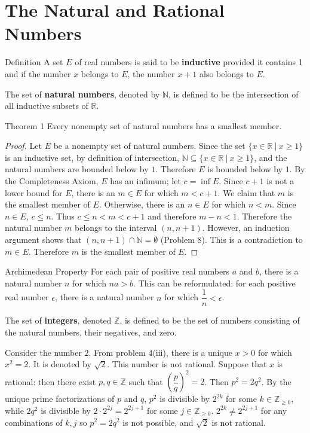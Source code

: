\documentclass[a4paper,10pt]{book}
\theoremstyle{plain} %
\newcommand{\thistheoremname}{}
\newtheorem*{genericthm*}{\thistheoremname}
\newenvironment{namedthm*}[1]
	{\renewcommand{\thistheoremname}{#1}%
	\begin{genericthm*}}
	{\end{genericthm*}}
\begin{document}
\section{The Natural and Rational Numbers}
\begin{flushleft}

\begin{namedthm*}{Definition}
	A set $E$ of real numbers is said to be \textbf{inductive} provided it contains 1 and if the number $x$ belongs to $E$, the number $x+1$ also belongs to $E$.
\end{namedthm*}

The set of \textbf{natural numbers}, denoted by $\mathbb{N}$, is defined to be the intersection of all inductive subsets of $\mathbb{R}$. 

\begin{namedthm*}{Theorem 1}
	Every nonempty set of natural numbers has a smallest member.
\end{namedthm*}
\begin{proof}
	Let $E$ be a nonempty set of natural numbers. Since the set $\{x\in \mathbb{R}\ |\ x \ge 1 \}$ is an inductive set, by definition of intersection, $\mathbb{N} \subseteq \{x\in \mathbb{R}\ |\ x \ge 1 \}$, and the natural numbers are bounded below by $1$.
	Therefore $E$ is bounded below by $1$. By the Completeness Axiom, $E$ has an infimum; let $c=\inf E$.
	Since $c+1$ is not a lower bound for $E$, there is an $m \in E$ for which $m < c+1$.
	We claim that $m$ is the smallest member of $E$. Otherwise, there is an $n\in E$ for which $n<m$. Since $n \in E$, $c\le n$. Thus $c \le n < m < c+1$ and therefore $m-n<1$.
	Therefore the natural number $m$ belongs to the interval $(n,n+1)$. However, an induction argument shows that $(n, n+1) \cap \mathbb{N} = \emptyset$ (Problem 8). 
	This is a contradiction to $m \in E$. Therefore $m$ is the smallest member of $E$.
\end{proof}

\begin{namedthm*}{Archimedean Property}
	For each pair of positive real numbers $a$ and $b$, there is a natural number $n$ for which $na>b$. This can be reformulated: for each positive real number $\epsilon$, there is a natural number $n$ for which $\dfrac{1}{n} < \epsilon$.
\end{namedthm*}

The set of \textbf{integers}, denoted $\mathbb{Z}$, is defined to be the set of numbers consisting of the natural numbers, their negatives, and zero.
\par
\medskip
Consider the number $2$. From problem 4(iii), there is a unique $x>0$ for which $x^2=2$. It is denoted by $\sqrt{2}$. This number is not rational.
Suppose that $x$ is rational: then there exist $p,q \in \mathbb{Z}$ such that $(\dfrac{p}{q})^2=2$. Then $p^2=2q^2$. 
By the unique prime factorizations of $p$ and $q$, $p^2$ is divisible by $2^{2k}$ for some $k \in \mathbb{Z}_{\ge 0}$, while $2q^2$ is divisible by $2 \cdot 2^{2j} = 2^{2j+1}$ for some $j \in \mathbb{Z}_{\ge 0}$.
$2^{2k} \neq 2^{2j+1}$ for any combinations of $k,j$ so $p^2=2q^2$ is not possible, and $\sqrt{2}$ is not rational.


\end{flushleft}
\end{document}
